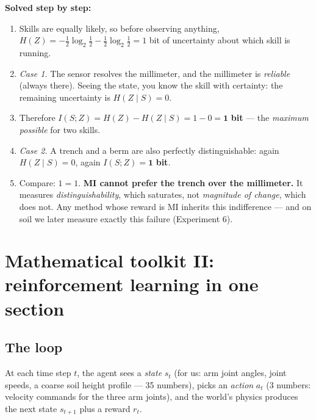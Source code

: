 \documentclass[11pt,a4paper]{article}
\begin{document}
\begin{worked}
\textbf{Solved step by step:}
\begin{enumerate}[leftmargin=6mm, itemsep=0mm]
\item Skills are equally likely, so before observing anything,
$H(Z) = -\tfrac12\log_2\tfrac12 - \tfrac12\log_2\tfrac12 = 1$ bit of
uncertainty about which skill is running.
\item \emph{Case 1.} The sensor resolves the millimeter, and the millimeter is
\emph{reliable} (always there). Seeing the state, you know the skill with
certainty: the remaining uncertainty is $H(Z \mid S) = 0$.
\item Therefore $I(S;Z) = H(Z) - H(Z\mid S) = 1 - 0 = \mathbf{1}$ \textbf{bit}
--- the \emph{maximum possible} for two skills.
\item \emph{Case 2.} A trench and a berm are also perfectly distinguishable:
again $H(Z \mid S) = 0$, again $I(S;Z) = \mathbf{1}$ \textbf{bit}.
\item Compare: $1 = 1$. \textbf{MI cannot prefer the trench over the
millimeter.} It measures \emph{distinguishability}, which saturates, not
\emph{magnitude of change}, which does not. Any method whose reward is MI
inherits this indifference --- and on soil we later measure exactly this
failure (Experiment 6).
\end{enumerate}
\end{worked}

\section{Mathematical toolkit II: reinforcement learning in one section}

\subsection{The loop}

At each time step $t$, the agent sees a \emph{state} $s_t$ (for us: arm joint
angles, joint speeds, a coarse soil height profile --- 35 numbers), picks an
\emph{action} $a_t$ (3 numbers: velocity commands for the three arm joints), and
the world's physics produces the next state $s_{t+1}$ plus a reward $r_t$.
\end{document}

